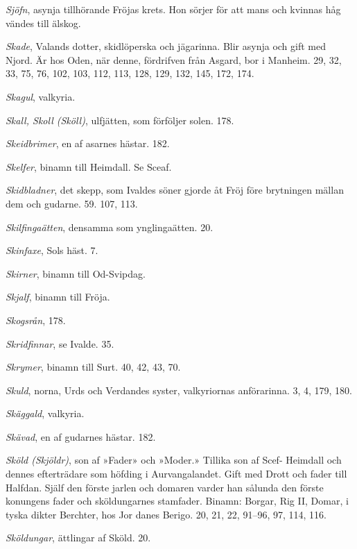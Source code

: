 \emph{Sjöfn}, asynja tillhörande Fröjas krets. Hon sörjer för att mans
och kvinnas håg vändes till älskog.

\emph{Skade}, Valands dotter, skidlöperska och jägarinna. Blir asynja
och gift med Njord. Är hos Oden, när denne, fördrifven från Asgard, bor
i Manheim. 29, 32, 33, 75, 76, 102, 103, 112, 113, 128, 129, 132, 145,
172, 174.

\emph{Skagul}, valkyria.

\emph{Skall, Skoll (Sköll)}, ulfjätten, som förföljer solen. 178.

\protect\hypertarget{lb1625905.xhtmlux5cux23start238}{}{}\protect\hypertarget{lb1625905.xhtmlux5cux23start238-a}{}{}\protect\hypertarget{lb1625905.xhtmlux5cux23start238-b}{}{}\protect\hypertarget{lb1625905.xhtmlux5cux23start238-c}{}{}\protect\hypertarget{lb1625905.xhtmlux5cux23start238-d}{}{}

\emph{Skeidbrimer}, en af asarnes hästar. 182.

\emph{Skelfer}, binamn till Heimdall. Se Sceaf.

\emph{Skidbladner}, det skepp, som Ivaldes söner gjorde åt Fröj före
brytningen mällan dem och gudarne. 59. 107, 113.

\emph{Skilfingaätten}, densamma som ynglingaätten. 20.

\emph{Skinfaxe}, Sols häst. 7.

\emph{Skirner}, binamn till Od-Svipdag.

\emph{Skjalf}, binamn till Fröja.

\emph{Skogsrån}, 178.

\emph{Skridfinnar}, se Ivalde. 35.

\emph{Skrymer}, binamn till Surt. 40, 42, 43, 70.

\emph{Skuld}, norna, Urds och Verdandes syster, valkyriornas
anförarinna. 3, 4, 179, 180.

\emph{Skäggald}, valkyria.

\emph{Skävad}, en af gudarnes hästar. 182.

\emph{Sköld (Skjöldr)}, son af »Fader» och »Moder.» Tillika son af Scef-
Heimdall och dennes efterträdare som höfding i Aurvangalandet. Gift med
Drott och fader till Halfdan. Själf den förste jarlen och domaren varder
han sålunda den förste konungens fader och sköldungarnes stamfader.
Binamn: Borgar, Rig II, Domar, i tyska dikter Berchter, hos Jor danes
Berigo. 20, 21, 22, 91--96, 97, 114, 116.

\emph{Sköldungar}, ättlingar af Sköld. 20.

